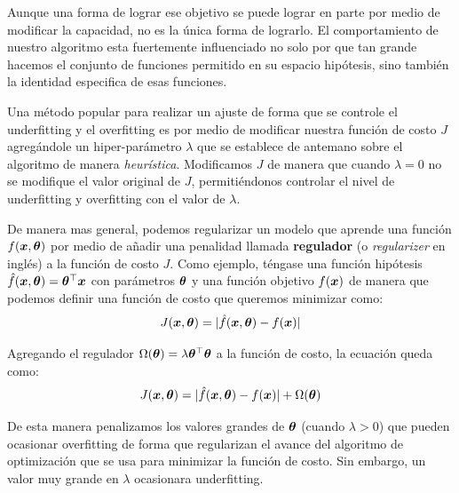 Aunque una forma de lograr ese objetivo se puede lograr en parte por medio de modificar la capacidad, no es la única forma de lograrlo. El comportamiento de nuestro algoritmo esta fuertemente influenciado no solo por que tan grande hacemos el conjunto de funciones permitido en su espacio hipótesis, sino también la identidad especifica de esas funciones.

Una método popular para realizar un ajuste de forma que se controle el \gls{underfitting} y el \gls{overfitting} es por medio de modificar nuestra función de costo $J$ agregándole un hiper-parámetro $\lambda$ que se establece de antemano sobre el algoritmo de manera \textit{heurística}. Modificamos $J$ de manera que cuando $\lambda = 0$ no se modifique el valor original de $J$, permitiéndonos controlar el nivel de \gls{underfitting} y \gls{overfitting} con el valor de $\lambda$.

De manera mas general, podemos regularizar un modelo que aprende una función $f({\bm{x}}, {\bm{\theta}})$ por medio de añadir una penalidad llamada \textbf{regulador} (o \textsl{regularizer} en inglés) a la función de costo $J$. Como ejemplo, téngase una función hipótesis $\hat{f}({\bm{x}}, {\bm{\theta}}) = {\bm{\theta}}^{\top} {\bm{x}}$ con parámetros ${\bm{\theta}}$ y una función objetivo $f({\bm{x}})$ de manera que podemos definir una función de costo que queremos minimizar como:
\begin{equation}
  J({\bm{x}}, {\bm{\theta}}) = | \hat{f}({\bm{x}}, {\bm{\theta}}) - f({\bm{x}}) |
\end{equation}

Agregando el regulador $\Omega({\bm{\theta}}) = \lambda {\bm{\theta}}^{\top} {\bm{\theta}} $ a la función de costo, la ecuación queda como:
\begin{equation}
  J({\bm{x}}, {\bm{\theta}}) = | \hat{f}({\bm{x}}, {\bm{\theta}}) - f({\bm{x}}) | + \Omega({\bm{\theta}})
\end{equation}

De esta manera penalizamos los valores grandes de ${\bm{\theta}}$ (cuando $\lambda > 0$) que pueden ocasionar \gls{overfitting} de forma que regularizan el avance del algoritmo de optimización que se usa para minimizar la función de costo. Sin embargo, un valor muy grande en $\lambda$ ocasionara \gls{underfitting}.

